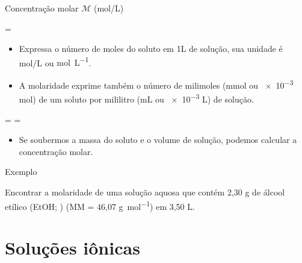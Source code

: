 \documentclass[presentation,professionalfonts,aspectratio=169]{beamer}
\begin{document}
\begin{frame}[label={sec:orgcc9e19c}]{Concentração molar \(\mathcal{M}\) (mol/L)}
\begin{tcolorbox}
=
\end{tcolorbox}

\begin{itemize}
\item Expressa o número de moles do soluto em 1L de solução, sua unidade é \alert{mol/L} ou \alert{\unit{\mole\per\liter}}.
\item A molaridade exprime também o número de milimoles (mmol ou \num{e-3} mol) de um soluto por mililitro (mL ou \num{e-3} L) de solução.
\end{itemize}

\begin{tcolorbox}
= \Longrightarrow {}=
\end{tcolorbox}

\begin{itemize}
\item Se soubermos a massa do soluto e o volume de solução, podemos calcular a concentração molar.
\end{itemize}
\end{frame}

\begin{frame}[label={sec:orga7eda4f}]{Exemplo}
\begin{question}
Encontrar a molaridade de uma solução aquosa que contém 2,30 g de álcool etílico (EtOH; ) (MM = 46,07 \unit{\gram\per\mole}) em 3,50 L.
\end{question}

\end{frame}

\section{Soluções iônicas}
\label{sec:org83d313e}
\end{document}
